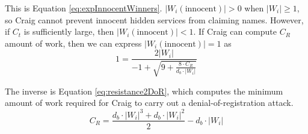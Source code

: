 \documentclass[USenglish,oneside,twocolumn]{article}
\newcommand*\nWinners{\left\vert{W_{i}}\right\vert}
\begin{document}
This is Equation \ref{eq:expInnocentWinners}. $ \left\vert{W_{i}(\mathrm{innocent})}\right\vert > 0 $ when $ \nWinners \geq 1 $, so Craig cannot prevent innocent hidden services from claiming names. However, if $ C_{t} $ is sufficiently large, then $ \left\vert{W_{i}(\mathrm{innocent})}\right\vert < 1 $. If Craig can compute $ C_{R} $ amount of work, then we can express $ \left\vert{W_{i}(\mathrm{innocent})}\right\vert = 1 $ as
\[
	1 = \frac{2 \nWinners}{-1 + \sqrt{9 + \frac{8 \cdot C_{R}}{d_{b} \cdot \nWinners}}}
\]

The inverse is Equation \ref{eq:resistance2DoR}, which computes the minimum amount of work required for Craig to carry out a denial-of-registration attack.
\[
	C_{R} = \frac{d_{b} \cdot \nWinners^{3} + d_{b} \cdot \nWinners^{2}}{2} - d_{b} \cdot \nWinners
\]



\end{document}
